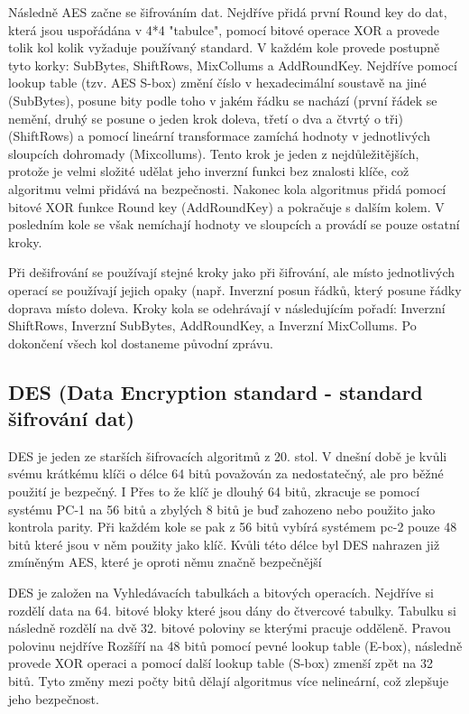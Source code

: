\documentclass[12pt,a4paper]{report}
\begin{document}
Následně AES začne se šifrováním dat. Nejdříve přidá první Round key do dat, která jsou uspořádána v 4*4 "tabulce", pomocí bitové operace XOR a provede tolik kol kolik vyžaduje používaný standard. V každém kole provede postupně tyto korky: SubBytes, ShiftRows, MixCollums a AddRoundKey. Nejdříve pomocí lookup table (tzv. AES S-box) změní číslo v hexadecimální soustavě na jiné (SubBytes), posune bity podle toho v jakém řádku se nachází (první řádek se nemění, druhý se posune o jeden krok doleva, třetí o dva a čtvrtý o tři) (ShiftRows) a pomocí lineární transformace zamíchá hodnoty v jednotlivých sloupcích dohromady (Mixcollums). Tento krok je jeden z nejdůležitějších, protože je velmi složité udělat jeho inverzní funkci bez znalosti klíče, což algoritmu velmi přidává na bezpečnosti. Nakonec kola algoritmus přidá pomocí bitové XOR funkce Round key (AddRoundKey) a pokračuje s dalším kolem. V posledním kole se však nemíchají hodnoty ve sloupcích a provádí se pouze ostatní kroky.

Při dešifrování se používají stejné kroky jako při šifrování, ale místo jednotlivých operací se používají jejich opaky (např. Inverzní posun řádků, který posune řádky doprava místo doleva. Kroky kola se odehrávají v následujícím pořadí: Inverzní ShiftRows, Inverzní SubBytes, AddRoundKey, a Inverzní MixCollums. Po dokončení všech kol dostaneme původní zprávu.

\subsection{DES (Data Encryption standard - standard šifrování dat)}
DES je jeden ze starších šifrovacích algoritmů z 20. stol. V dnešní době je kvůli svému krátkému klíči o délce 64 bitů považován za nedostatečný, ale pro běžné použití je bezpečný. I Přes to že klíč je dlouhý 64 bitů, zkracuje se pomocí systému PC-1 na 56 bitů a zbylých 8 bitů je buď zahozeno nebo použito jako kontrola parity. Při každém kole se pak z 56 bitů vybírá systémem pc-2 pouze 48 bitů které jsou v něm použity jako klíč. Kvůli této délce byl DES nahrazen již zmíněným AES, které je oproti němu značně bezpečnější

DES je založen na Vyhledávacích tabulkách a bitových operacích. Nejdříve si rozdělí data na 64. bitové bloky které jsou dány do čtvercové tabulky. Tabulku si následně rozdělí na dvě 32. bitové poloviny se kterými pracuje odděleně. Pravou polovinu nejdříve Rozšíří na 48 bitů pomocí pevné lookup table (E-box), následně provede XOR operaci a pomocí další lookup table (S-box) zmenší zpět na 32 bitů. Tyto změny mezi počty bitů dělají algoritmus více nelineární, což zlepšuje jeho bezpečnost.
\end{document}
